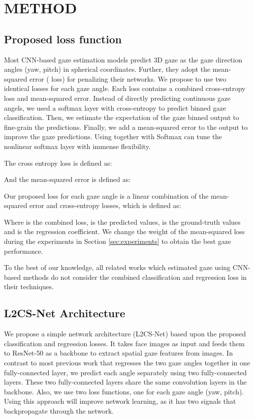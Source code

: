 \documentclass{article}
\begin{document}
\section{METHOD}
\label{sec:method}
\subsection{Proposed loss function}
Most CNN-based gaze estimation models predict 3D gaze as the gaze direction angles (yaw, pitch) in spherical coordinates. Further, they adopt the mean-squared error ( loss) for penalizing their networks. We propose to use two identical losses for each gaze angle. Each loss contains a combined cross-entropy loss and mean-squared error. Instead of directly predicting continuous gaze angels, we used a softmax layer with cross-entropy to predict binned gaze classification. Then, we estimate the expectation of the gaze binned output to fine-grain the predictions. Finally, we add a mean-squared error to the output to improve the gaze predictions. Using  together with Softmax can tune the nonlinear softmax layer with immense flexibility.


The cross entropy loss is defined as:




And the mean-squared error is defined as:



Our proposed loss for each gaze angle is a linear combination of the mean-squared error and cross-entropy losses, which is defined as:



Where  is the combined loss,  is the predicted values,  is the ground-truth values and  is the regression coefficient. We change the weight of the mean-squared loss during the experiments in Section \ref{sec:experiments} to obtain the best gaze performance. 

To the best of our knowledge, all related works which estimated gaze using CNN-based methods do not consider the combined classification and regression loss in their techniques.
\subsection{L2CS-Net Architecture}
We propose a simple network architecture (L2CS-Net) based upon the proposed classification and regression losses. It takes face images as input and feeds them to ResNet-50 as a backbone to extract spatial gaze features from images. In contrast to most previous work that regresses the two gaze angles together in one fully-connected layer, we predict each angle separately using two fully-connected layers. These two fully-connected layers share the same convolution layers in the backbone. Also, we use two loss functions, one for each gaze angle (yaw, pitch). Using this approach will improve network learning, as it has two signals that backpropagate through the network.
\end{document}
